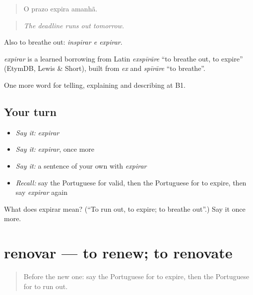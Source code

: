 \begin{quote}
O prazo expira amanhã.
\end{quote}

\begin{quote}
\emph{The deadline runs out tomorrow.}
\end{quote}

Also to breathe out: \emph{inspirar e expirar}.

\begin{cousinweb}
\emph{expirar} is a learned borrowing from Latin \emph{exspīrāre} \textquotedblleft{}to breathe out, to expire\textquotedblright{} (EtymDB, Lewis \& Short), built from \emph{ex} and \emph{spīrāre} \textquotedblleft{}to breathe\textquotedblright{}.
\end{cousinweb}

\begin{grammarlens}[title={What you've built}]
One more word for telling, explaining and describing at B1.
\end{grammarlens}

\subsection*{Your turn}
\begin{itemize}
\raggedright
  \item \emph{Say it:} \emph{expirar}
  \item \emph{Say it:} \emph{expirar}, once more
  \item \emph{Say it:} a sentence of your own with \emph{expirar}
  \item \emph{Recall:} say the Portuguese for valid, then the Portuguese for to expire, then say \emph{expirar} again
\end{itemize}

\begin{tcolorbox}[breakable,colback=teal!4,colframe=teal!35!black,title={Before you move on}]
What does expirar mean? (\textquotedblleft{}To run out, to expire; to breathe out\textquotedblright{}.) Say it once more.
\end{tcolorbox}
\section[renovar]{renovar — to renew; to renovate}

\label{lesson:PT-C384-renovar}



\begin{quote}
Before the new one: say the Portuguese for to expire, then the Portuguese for to run out.
\end{quote}

